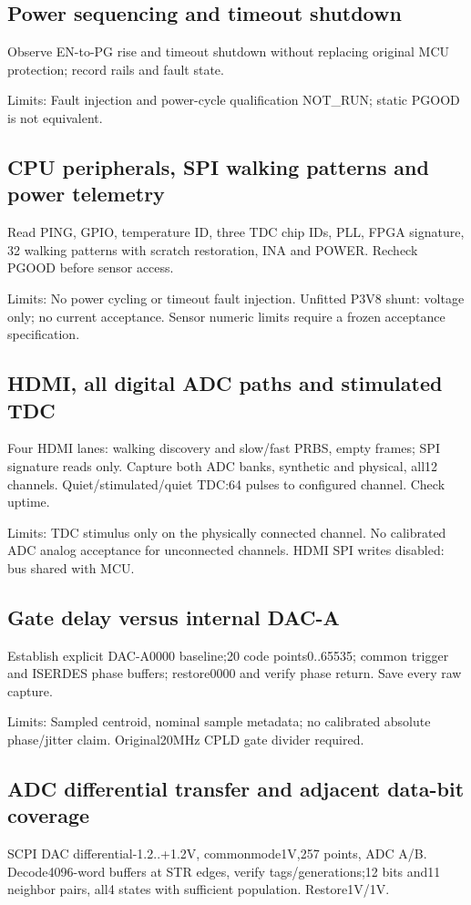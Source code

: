 \subsection{Power sequencing and timeout shutdown}
Observe EN-to-PG rise and timeout shutdown without replacing original MCU protection; record rails and fault state.

Limits: Fault injection and power-cycle qualification NOT\_RUN; static PGOOD is not equivalent.

\subsection{CPU peripherals, SPI walking patterns and power telemetry}
Read PING, GPIO, temperature ID, three TDC chip IDs, PLL, FPGA signature, 32 walking patterns with scratch restoration, INA and POWER. Recheck PGOOD before sensor access.

Limits: No power cycling or timeout fault injection. Unfitted P3V8 shunt: voltage only; no current acceptance. Sensor numeric limits require a frozen acceptance specification.

\subsection{HDMI, all digital ADC paths and stimulated TDC}
Four HDMI lanes: walking discovery and slow/fast PRBS, empty frames; SPI signature reads only. Capture both ADC banks, synthetic and physical, all12 channels. Quiet/stimulated/quiet TDC:64 pulses to configured channel. Check uptime.

Limits: TDC stimulus only on the physically connected channel. No calibrated ADC analog acceptance for unconnected channels. HDMI SPI writes disabled: bus shared with MCU.

\subsection{Gate delay versus internal DAC-A}
Establish explicit DAC-A0000 baseline;20 code points0..65535; common trigger and ISERDES phase buffers; restore0000 and verify phase return. Save every raw capture.

Limits: Sampled centroid, nominal sample metadata; no calibrated absolute phase/jitter claim. Original20MHz CPLD gate divider required.

\subsection{ADC differential transfer and adjacent data-bit coverage}
SCPI DAC differential-1.2..+1.2V, commonmode1V,257 points, ADC A/B. Decode4096-word buffers at STR edges, verify tags/generations;12 bits and11 neighbor pairs, all4 states with sufficient population. Restore1V/1V.

